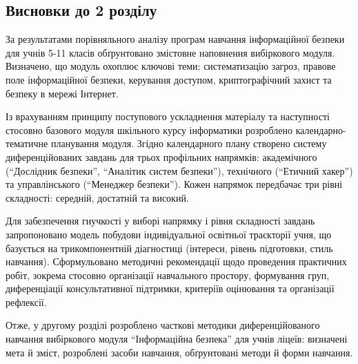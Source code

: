 \subsection*{Висновки до 2 розділу}

За результатами порівняльного аналізу програм навчання інформаційної безпеки для учнів 5-11 класів обґрунтовано змістовне наповнення вибіркового модуля. Визначено, що модуль охоплює ключові теми: систематизацію загроз, правове поле інформаційної безпеки, керування доступом, криптографічний захист та безпеку в мережі Інтернет.

Із врахуванням принципу поступового ускладнення матеріалу та  наступності стосовно базового модуля шкільного курсу інформатики розроблено календарно-тематичне планування модуля. Згідно календарного плану створено систему диференційованих завдань для трьох профільних напрямків: академічного (``Дослідник безпеки'', ``Аналітик систем безпеки''), технічного (``Етичний хакер'') та управлінського (``Менеджер безпеки''). Кожен напрямок передбачає три рівні складності: середній, достатній та високий.

Для забезпечення гнучкості у виборі напрямку і рівня складності завдань запропоновано модель побудови індивідуальної освітньої траєкторії учня, що базується на трикомпонентній діагностиці (інтереси, рівень підготовки, стиль навчання). Сформульовано методичні рекомендації щодо проведення практичних робіт, зокрема стосовно організації навчального простору, формування груп, диференціації консультативної підтримки, критеріїв оцінювання та організації рефлексії.

Отже, у другому розділі розроблено часткові методики диференційованого навчання вибіркового модуля ``Інформаційна безпека'' для учнів ліцеїв: визначені мета й зміст, розроблені засоби навчання, обґрунтовані  методи й форми навчання. 
    
    
